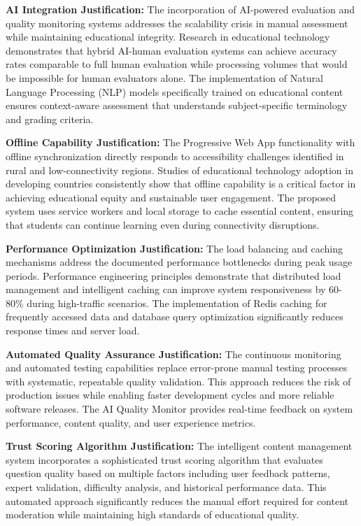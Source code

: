 \documentclass[12pt,a4paper,oneside]{book}
\begin{document}
\textbf{AI Integration Justification:}
The incorporation of AI-powered evaluation and quality monitoring systems addresses the scalability crisis in manual assessment while maintaining educational integrity. Research in educational technology demonstrates that hybrid AI-human evaluation systems can achieve accuracy rates comparable to full human evaluation while processing volumes that would be impossible for human evaluators alone. The implementation of Natural Language Processing (NLP) models specifically trained on educational content ensures context-aware assessment that understands subject-specific terminology and grading criteria.

\textbf{Offline Capability Justification:}
The Progressive Web App functionality with offline synchronization directly responds to accessibility challenges identified in rural and low-connectivity regions. Studies of educational technology adoption in developing countries consistently show that offline capability is a critical factor in achieving educational equity and sustainable user engagement. The proposed system uses service workers and local storage to cache essential content, ensuring that students can continue learning even during connectivity disruptions.

\textbf{Performance Optimization Justification:}
The load balancing and caching mechanisms address the documented performance bottlenecks during peak usage periods. Performance engineering principles demonstrate that distributed load management and intelligent caching can improve system responsiveness by 60-80\% during high-traffic scenarios. The implementation of Redis caching for frequently accessed data and database query optimization significantly reduces response times and server load.

\textbf{Automated Quality Assurance Justification:}
The continuous monitoring and automated testing capabilities replace error-prone manual testing processes with systematic, repeatable quality validation. This approach reduces the risk of production issues while enabling faster development cycles and more reliable software releases. The AI Quality Monitor provides real-time feedback on system performance, content quality, and user experience metrics.

\textbf{Trust Scoring Algorithm Justification:}
The intelligent content management system incorporates a sophisticated trust scoring algorithm that evaluates question quality based on multiple factors including user feedback patterns, expert validation, difficulty analysis, and historical performance data. This automated approach significantly reduces the manual effort required for content moderation while maintaining high standards of educational quality.
\end{document}
